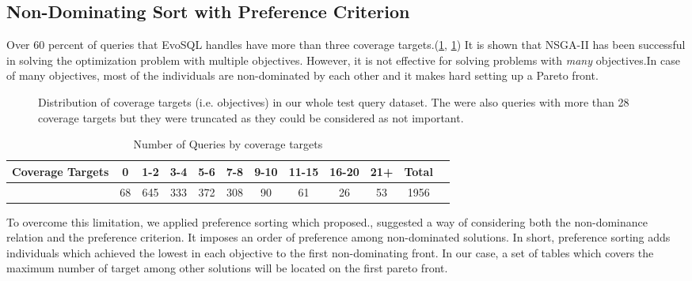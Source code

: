 \subsection{Non-Dominating Sort with Preference Criterion}
Over 60 percent of queries that EvoSQL handles have more than three coverage targets.(\cref{fig:cov_targets_dist}, \cref{tbl:num_of_coverage_targets}) It is shown that NSGA-II has been successful in solving the optimization problem with multiple objectives. However, it is not effective for solving problems with \textit{many} objectives.In case of many objectives, most of the individuals are non-dominated by each other and it makes hard setting up a Pareto front. 


\begin{figure}
	\centering
	\caption{Distribution of coverage targets (i.e. objectives) in our whole test query dataset. The were also queries with more than 28 coverage targets but they were truncated as they could be considered as not important.}
	\label{fig:cov_targets_dist}
\end{figure}

\begin{table}
	\centering
	\caption{Number of Queries by coverage targets}
	
	\begin{tabular}{c|c|c|c|c|c|c|c|c|c|cr}
		Coverage Targets & 0 & 1-2 & 3-4 & 5-6 & 7-8 & 9-10 & 11-15 & 16-20 & 21+ & Total \\ 
		\hline
		& 68 & 645 & 333 & 372 & 308 & 90  & 61  & 26   & 53  & 1956
	\end{tabular} 
	\label{tbl:num_of_coverage_targets}
\end{table}


To overcome this limitation, we applied preference sorting which \cite{panichella2015reformulating} proposed., \cite{panichella2015reformulating} suggested a way of considering both the non-dominance relation and the preference criterion. It imposes an order of preference among non-dominated solutions. In short, preference sorting adds individuals which achieved the lowest in each objective to the first non-dominating front.  In our case, a set of tables which covers the maximum number of target among other solutions will be located on the first pareto front. 



